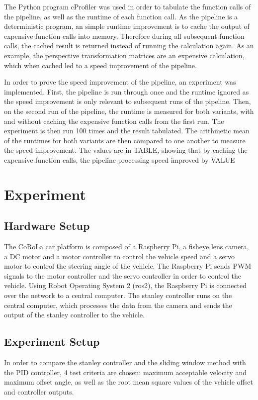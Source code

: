 \documentclass[arbeit=studie,oneside,BCOR=12mm]{ArbeitRST}
\begin{document}
The Python program cProfiler was used in order to tabulate the function calls of
the pipeline, as well as the runtime of each function call. As the pipeline is a
deterministic program, an simple runtime improvement is to cache the output of 
expensive function calls into memory. Therefore during all subsequent function 
calls, the cached result is returned instead of running the calculation again. 
As an example, the perspective transformation matrices are an expensive 
calculation, which when cached led to a speed improvement of the pipeline.

In order to prove the speed improvement of the pipeline, an experiment was 
implemented. First, the pipeline is run through once and the runtime ignored as
the speed improvement is only relevant to subsequent runs of the pipeline. Then,
on the second run of the pipeline, the runtime is measured for both variants, 
with and without caching the expensive function calls from the first run. The 
experiment is then run 100 times and the result tabulated. The arithmetic mean 
of the runtimes for both variants are then compared to one another to measure 
the speed improvement. The values are in TABLE, showing that by caching the 
expensive function calls, the pipeline processing speed improved by VALUE%

\chapter{Experiment}
\section{Hardware Setup}
The CoRoLa car platform is composed of a Raspberry Pi, a fisheye lens camera, a
DC motor and a motor controller to control the vehicle speed and a servo motor
to control the steering angle of the vehicle. The Raspberry Pi sends PWM
signals to the motor controller and the servo controller in order to control
the vehicle. Using Robot Operating System 2 (ros2), the Raspberry Pi is
connected over the network to a central computer. The stanley controller runs
on the central computer, which processes the data from the camera and sends the
output of the stanley controller to the vehicle.

\section{Experiment Setup}
In order to compare the stanley controller and the sliding window method with
the PID controller, 4 test criteria are chosen: maximum acceptable velocity and
maximum offset angle, as well as the root mean square values of the vehicle
offset and controller outputs.
\end{document}
